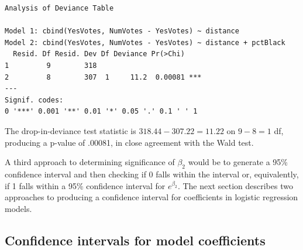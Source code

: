 \documentclass[
]{krantz}
\begin{document}
\begin{verbatim}
Analysis of Deviance Table

Model 1: cbind(YesVotes, NumVotes - YesVotes) ~ distance
Model 2: cbind(YesVotes, NumVotes - YesVotes) ~ distance + pctBlack
  Resid. Df Resid. Dev Df Deviance Pr(>Chi)    
1         9        318                         
2         8        307  1     11.2  0.00081 ***
---
Signif. codes:  
0 '***' 0.001 '**' 0.01 '*' 0.05 '.' 0.1 ' ' 1
\end{verbatim}

The drop-in-deviance test statistic is \(318.44 - 307.22 = 11.22\) on \(9 - 8 = 1\) df, producing a p-value of .00081, in close agreement with the Wald test.

A third approach to determining significance of \(\beta_2\) would be to generate a 95\% confidence interval and then checking if 0 falls within the interval or, equivalently, if 1 falls within a 95\% confidence interval for \(e^{\beta_2}.\) The next section describes two approaches to producing a confidence interval for coefficients in logistic regression models.

\hypertarget{confidence-intervals-for-model-coefficients}{%
\subsection{Confidence intervals for model coefficients}\label{confidence-intervals-for-model-coefficients}}
\end{document}
